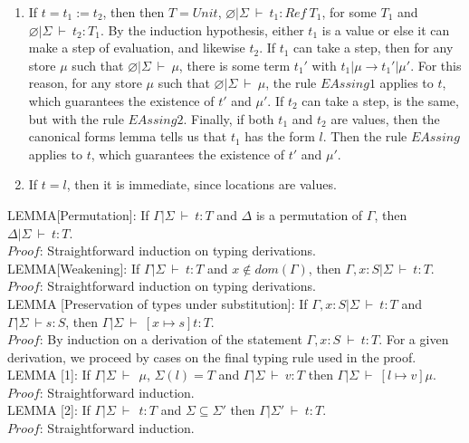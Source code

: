 \documentclass{article}
\newcommand{\tto}{\longrightarrow}
\newcommand{\env}{{\Gamma | \Sigma \ \vdash}}
\newcommand{\envE}{{\varnothing | \Sigma \ \vdash}}
\newcommand{\envEP}{{\Gamma | \Sigma \ \vdash \ }}
\begin{document}
\begin{enumerate}
\item If $t = t_1 := t_2$, then then $T = Unit$, $\envE \ t_1 : Ref \ T_1$, for some $T_1$ and $\envE \ t_2 : T_1$. By the induction hypothesis, either $t_1$ is a value or else it can make a step of evaluation, and likewise $t_2$. If $t_1$ can take a step, then for any store $\mu$ such that $\envE \ \mu$, there is some term $t_1'$ with $t_1|\mu \tto t_1'|\mu'$. For this reason, for any store $\mu$ such that $\envE \ \mu$, the rule $EAssing1$ applies to $t$, which guarantees the existence of $t'$ and $\mu'$. If $t_2$ can take a step, is the same, but with the rule $EAssing2$. Finally, if both $t_1$ and $t_2$ are values, then the canonical forms lemma tells us that $t_1$ has the form $l$. Then the rule $EAssing$ applies to $t$, which guarantees the existence of $t'$ and $\mu'$.
\item If $t = l$, then it is immediate, since locations are values.

\end{enumerate}

LEMMA[Permutation]: If $\env \ t : T$ and $\Delta$ is a permutation of $\Gamma$, then $\Delta | \Sigma \ \vdash \ t : T$.\\
$Proof$: Straightforward induction on typing derivations.\ \\

LEMMA[Weakening]: If $\env \ t : T$ and $x \not \in dom(\Gamma)$, then $\Gamma, x : S | \Sigma \ \vdash \ t:T$.\\
$Proof$: Straightforward induction on typing derivations.\ \\

LEMMA [Preservation of types under substitution]: If $\Gamma , x:S  | \Sigma \ \vdash \ t : T$ and $\env s : S$, then $\env \ [x \mapsto s]t : T$.\\
$Proof$: By induction on a derivation of the statement $ \Gamma, x:S \ \vdash \ t : T$. For a given derivation, we proceed by cases on the final typing rule used in the proof.\\

LEMMA [1]: If $\envEP \ \mu$, $\Sigma(l) = T$ and $ \env \ v:T$ then $\envEP [l \mapsto v]\mu$.\\
$Proof$: Straightforward induction.\ \\

LEMMA [2]: If $\envEP \ t : T$ and $\Sigma \subseteq \Sigma'$ then $\Gamma | \Sigma' \ \vdash \ t:T$.\\
$Proof$: Straightforward induction.\ \\
\end{document}
